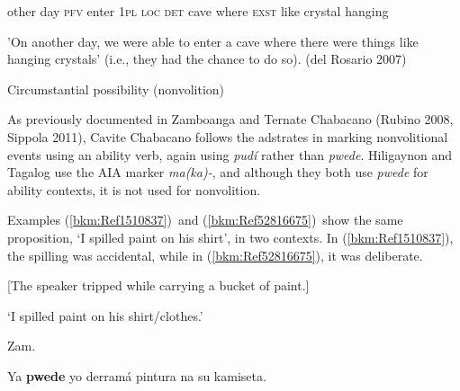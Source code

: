 \begin{stylelsLanginfo}
other day \textsc{pfv} enter 1\textsc{pl loc det }cave where \textsc{exst }like crystal hanging
\end{stylelsLanginfo}

\begin{stylelsLanginfo}
{}'On another day, we were able to enter a cave where there were things like hanging crystals' (i.e., they had the chance to do so). (del Rosario 2007)
\end{stylelsLanginfo}


\setcounter{listWWNumiiileveli}{0}
\begin{listWWNumiiileveli}
\item 
\begin{stylelsSectioniii}
Circumstantial possibility (nonvolition)
\end{stylelsSectioniii}
\end{listWWNumiiileveli}
\begin{styleStandard}
As previously documented in Zamboanga and Ternate Chabacano (Rubino 2008, Sippola 2011), Cavite Chabacano follows the adstrates in marking nonvolitional events using an ability verb, again using \textit{pudí} rather than \textit{pwede}. Hiligaynon and Tagalog use the AIA marker \textit{ma(ka)-}, and although they both use \textit{pwede} for ability contexts, it is not used for nonvolition.
\end{styleStandard}

\begin{styleStandard}
Examples (\ref{bkm:Ref1510837})\ and (\ref{bkm:Ref52816675})\ show the same proposition, ‘I spilled paint on his shirt’, in two contexts. In (\ref{bkm:Ref1510837}), the spilling was accidental, while in (\ref{bkm:Ref52816675}), it was deliberate. 
\end{styleStandard}


\setcounter{listWWNumiileveli}{0}
\begin{listWWNumiileveli}
\item 
\begin{stylelsLanginfo}
\label{bkm:Ref1510837}[The speaker tripped while carrying a bucket of paint.] 
\end{stylelsLanginfo}
\end{listWWNumiileveli}
\begin{stylelsLanginfo}
‘I spilled paint on his shirt/clothes.’
\end{stylelsLanginfo}

\begin{listWWNumiileveli}
\item 
\begin{listWWNumiilevelii}
\item 
\begin{stylelsLanginfo}
Zam.
\end{stylelsLanginfo}
\end{listWWNumiilevelii}
\end{listWWNumiileveli}
\begin{stylelsSourceline}
Ya \textbf{pwede} yo derram\'{a} pintura na su kamiseta.
\end{stylelsSourceline}


